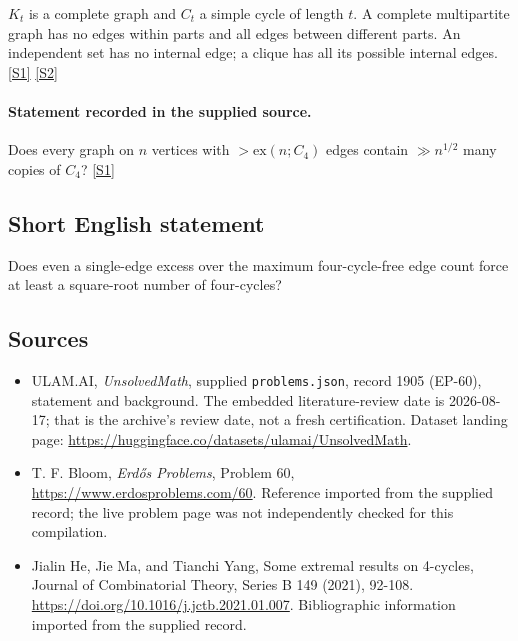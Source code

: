 \documentclass[11pt,a4paper]{article}
\newcommand{\sref}[2]{\hyperlink{source:#1:#2}{[S#2]}}
\begin{document}
$K_t$ is a complete graph and $C_t$ a simple cycle of length $t$. A complete multipartite graph has no edges within parts and all edges between different parts. An independent set has no internal edge; a clique has all its possible internal edges. \sref{1905}{1} \sref{1905}{2}

\paragraph{Statement recorded in the supplied source.}
Does every graph on $n$ vertices with $>\mathrm{ex}(n;C_4)$ edges contain $\gg n^{1/2}$ many copies of $C_4$? \sref{1905}{1}

\subsection{Short English statement}

Does even a single-edge excess over the maximum four-cycle-free edge count force at least a square-root number of four-cycles?

\subsection{Sources}

{\small

\begin{itemize}

\item[\hypertarget{source:1905:1}{S1}] ULAM.AI, \emph{UnsolvedMath}, supplied \texttt{problems.json}, record 1905 (EP-60), statement and background. The embedded literature-review date is 2026-08-17; that is the archive’s review date, not a fresh certification. Dataset landing page: \url{https://huggingface.co/datasets/ulamai/UnsolvedMath}.

\item[\hypertarget{source:1905:2}{S2}] T. F. Bloom, \emph{Erdős Problems}, Problem 60, \url{https://www.erdosproblems.com/60}. Reference imported from the supplied record; the live problem page was not independently checked for this compilation.

\item[\hypertarget{source:1905:3}{S3}] Jialin He, Jie Ma, and Tianchi Yang, Some extremal results on 4-cycles, Journal of Combinatorial Theory, Series B 149 (2021), 92-108. \url{https://doi.org/10.1016/j.jctb.2021.01.007}. Bibliographic information imported from the supplied record.

\end{itemize}

}

\label{end:1905}
\end{document}
